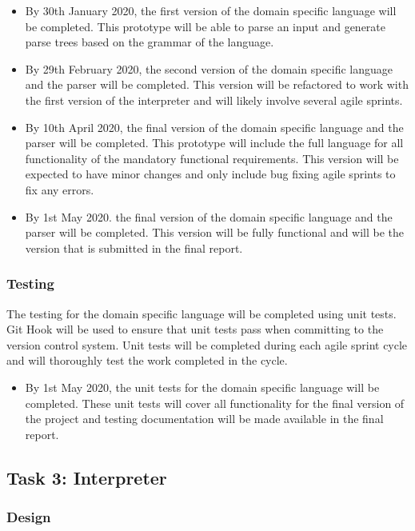 \documentclass[chapterprefix=false]{scrreprt}
\begin{document}
\begin{itemize}
 \setlength\itemsep{-0.75em}
 \item By 30th January 2020, the first version of the domain specific language will be completed. This prototype will be able to parse an input and generate parse trees based on the grammar of the language.
 \item By 29th February 2020, the second version of the domain specific language and the parser will be completed. This version will be refactored to work with the first version of the interpreter and will likely involve several agile sprints.
 \item By 10th April 2020, the final version of the domain specific language and the parser will be completed. This prototype will include the full language for all functionality of the mandatory functional requirements. This version will be expected to have minor changes and only include bug fixing agile sprints to fix any errors.
 \item By 1st May 2020. the final version of the domain specific language and the parser will be completed. This version will be fully functional and will be the version that is submitted in the final report.
\end{itemize}

\subsubsection{Testing}

The testing for the domain specific language will be completed using unit tests. Git Hook will be used to ensure that unit tests pass when committing to the version control system. Unit tests will be completed during each agile sprint cycle and will thoroughly test the work completed in the cycle.

\begin{itemize}
 \setlength\itemsep{-0.75em}
 \item By 1st May 2020, the unit tests for the domain specific language will be completed. These unit tests will cover all functionality for the final version of the project and testing documentation will be made available in the final report.
\end{itemize}

\subsection{Task 3: Interpreter}

\subsubsection{Design}
\end{document}
